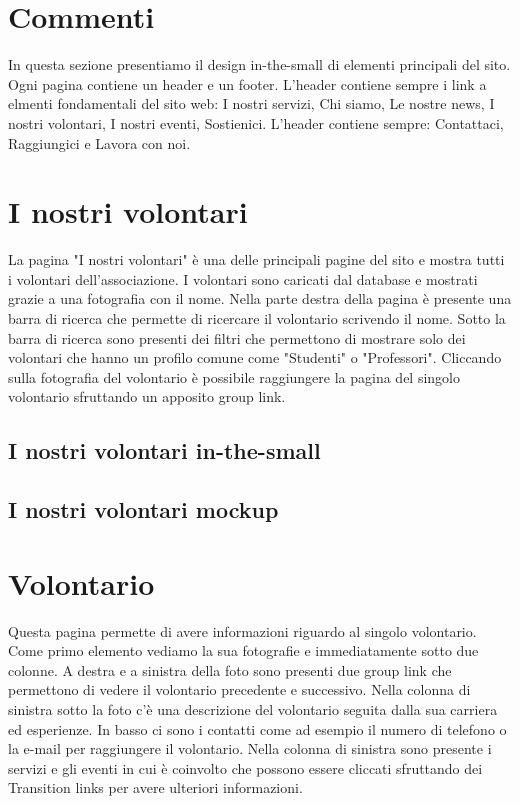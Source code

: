     \section{Commenti}
    In questa sezione presentiamo il design in-the-small di elementi principali
    del sito. Ogni pagina contiene un header e un footer. L'header contiene
    sempre i link a elmenti fondamentali del sito web: I nostri servizi, Chi
    siamo, Le nostre news, I nostri volontari, I nostri eventi, Sostienici.
    L'header contiene sempre: Contattaci, Raggiungici e Lavora con noi.
    \section{I nostri volontari}
    La pagina "I nostri volontari" è una delle principali pagine del sito e
    mostra tutti i volontari dell'associazione. I volontari sono caricati dal
    database e mostrati grazie a una fotografia con il nome. Nella parte destra
    della pagina è presente una barra di ricerca che permette di ricercare il
    volontario scrivendo il nome. Sotto la barra di ricerca sono presenti dei
    filtri che permettono di mostrare solo dei volontari che hanno un profilo
    comune come "Studenti" o "Professori". Cliccando sulla fotografia del
    volontario è possibile raggiungere la pagina del singolo volontario
    sfruttando un apposito group link.

        \subsection{I nostri volontari in-the-small}

        \subsection{I nostri volontari mockup}

    \section{Volontario}
    Questa pagina permette di avere informazioni riguardo al singolo volontario.
    Come primo elemento vediamo la sua fotografie e immediatamente sotto due
    colonne. A destra e a sinistra della foto sono presenti due group link che
    permettono di vedere il volontario precedente e successivo. Nella colonna di
    sinistra sotto la foto c'è una descrizione del volontario seguita dalla sua
    carriera ed esperienze. In basso ci sono i contatti come ad esempio il
    numero di telefono o la e-mail per raggiungere il volontario. Nella colonna
    di sinistra sono presente i servizi e gli eventi in cui è coinvolto che
    possono essere cliccati sfruttando dei Transition links per avere ulteriori
    informazioni.

